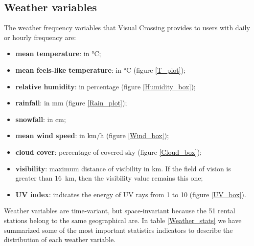 \subsection{Weather variables}
The weather frequency variables that Visual Crossing provides to users with daily or hourly frequency are:
\begin{itemize}
	\item \textbf{mean temperature}: in \unit{\degreeCelsius};
	\item \textbf{mean feels-like temperature}: in \unit{\degreeCelsius} (figure \ref{T_plot});
	\item \textbf{relative humidity}: in percentage (figure \ref{Humidity_box});
	\item \textbf{rainfall}: in \unit{\milli\meter} (figure \ref{Rain_plot});
	\item \textbf{snowfall}: in \unit{\centi\meter};
	\item \textbf{mean wind speed}: in \unit{\kilo\meter/\hour} (figure \ref{Wind_box});
	\item \textbf{cloud cover}: percentage of covered sky (figure \ref{Cloud_box});
	\item \textbf{visibility}: maximum distance of visibility in \unit{\kilo\meter}. If the field of vision is greater than \SI{16}{\kilo\meter}, then the visibility value remains this one;
	\item \textbf{UV index}: indicates the energy of UV rays from \num{1} to \num{10} (figure \ref{UV_box}).
\end{itemize}
Weather variables are time-variant, but space-invariant because the \num{51} rental stations belong to the same geographical are. In table \ref{Weather_stats} we have summarized some of the most important statistics indicators to describe the distribution of each weather variable.

